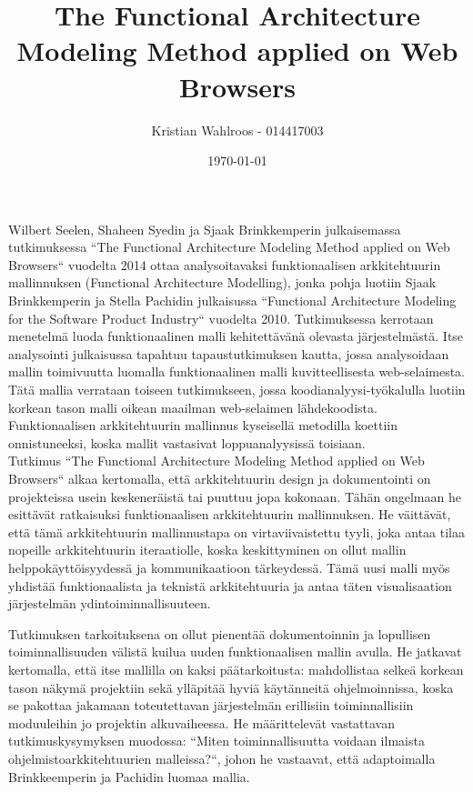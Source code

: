\documentclass[finnish]{tktltiki2}
\title{The Functional Architecture Modeling Method applied on Web Browsers}
\author{Kristian Wahlroos - 014417003}
\date{\today}
\theoremstyle{definition}
\theoremstyle{remark}
\begin{document}

\frontmatter      %

\maketitle        %



\mainmatter       %


Wilbert Seelen, Shaheen Syedin ja Sjaak Brinkkemperin julkaisemassa tutkimuksessa ``The Functional Architecture Modeling Method applied on Web Browsers`` vuodelta 2014 ottaa analysoitavaksi funktionaalisen arkkitehtuurin mallinnuksen (Functional Architecture Modelling), jonka pohja luotiin Sjaak Brinkkemperin ja Stella Pachidin julkaisussa ``Functional Architecture Modeling for the Software Product Industry`` vuodelta 2010. Tutkimuksessa kerrotaan menetelmä luoda funktionaalinen malli kehitettävänä olevasta järjestelmästä. Itse analysointi julkaisussa tapahtuu tapaustutkimuksen kautta, jossa analysoidaan mallin toimivuutta luomalla funktionaalinen malli kuvitteellisesta web-selaimesta. Tätä mallia verrataan toiseen tutkimukseen, jossa koodianalyysi-työkalulla luotiin korkean tason malli oikean maailman web-selaimen lähdekoodista. Funktionaalisen arkkitehtuurin mallinnus kyseisellä metodilla koettiin onnistuneeksi, koska mallit vastasivat loppuanalyysissä toisiaan.\\

Tutkimus ``The Functional Architecture Modeling Method applied on Web Browsers`` alkaa kertomalla, että arkkitehtuurin design ja dokumentointi on projekteissa usein keskeneräistä tai puuttuu jopa kokonaan. Tähän ongelmaan he esittävät ratkaisuksi funktionaalisen arkkitehtuurin mallinnuksen. He väittävät, että tämä arkkitehtuurin mallinnustapa on virtaviivaistettu tyyli, joka antaa tilaa nopeille arkkitehtuurin iteraatiolle, koska keskittyminen on ollut mallin helppokäyttöisyydessä ja kommunikaatioon tärkeydessä. Tämä uusi malli myös yhdistää funktionaalista ja teknistä arkkitehtuuria ja antaa täten visualisaation järjestelmän ydintoiminnallisuuteen.  

Tutkimuksen tarkoituksena on ollut pienentää dokumentoinnin ja lopullisen toiminnallisuuden välistä kuilua uuden funktionaalisen mallin avulla. He jatkavat kertomalla, että itse mallilla on kaksi päätarkoitusta: mahdollistaa selkeä korkean tason näkymä projektiin sekä ylläpitää hyviä käytänneitä ohjelmoinnissa, koska se pakottaa jakamaan toteutettavan järjestelmän erillisiin toiminnallisiin moduuleihin jo projektin alkuvaiheessa. He määrittelevät vastattavan tutkimuskysymyksen muodossa: ``Miten toiminnallisuutta voidaan ilmaista ohjelmistoarkkitehtuurien malleissa?``, johon he vastaavat, että adaptoimalla Brinkkeemperin ja Pachidin luomaa mallia. 
\end{document}
